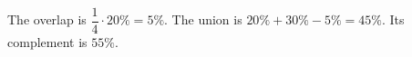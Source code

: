 The overlap is $\dfrac{1}{4}\cdot20\%=5\%$. The union is $20\%+30\%-5\%=45\%$. Its complement is $\boxed{55\%}$.
